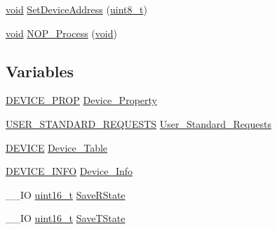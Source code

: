\begin{DoxyCompactItemize}
\item 
\hyperlink{group___n_a_m_e_ga18028b8badbf1ea7e704ccac3c488e82}{void} \hyperlink{_s_t_m32_f30x_2_libraries_2_s_t_m32___u_s_b-_f_s-_device___driver_2inc_2usb__core_8h_afcdbe02cf447bb583c34dd9babbd9f5a}{Set\-Device\-Address} (\hyperlink{stdint_8h_aba7bc1797add20fe3efdf37ced1182c5}{uint8\-\_\-t})
\item 
\hyperlink{group___n_a_m_e_ga18028b8badbf1ea7e704ccac3c488e82}{void} \hyperlink{_s_t_m32_f30x_2_libraries_2_s_t_m32___u_s_b-_f_s-_device___driver_2inc_2usb__core_8h_a5576d2ea5bf87fec71925b8e20048e74}{N\-O\-P\-\_\-\-Process} (\hyperlink{group___n_a_m_e_ga18028b8badbf1ea7e704ccac3c488e82}{void})
\end{DoxyCompactItemize}
\subsection*{Variables}
\begin{DoxyCompactItemize}
\item 
\hyperlink{_s_t_m32_f10x_2_libraries_2_s_t_m32___u_s_b-_f_s-_device___driver_2inc_2usb__core_8h_a90353becd4185446508b796a7f39fbce}{D\-E\-V\-I\-C\-E\-\_\-\-P\-R\-O\-P} \hyperlink{group___p_i_o_s___u_s_b_h_o_o_k_ga646bdfc60e69ee637f2c39b5bb91dfec}{Device\-\_\-\-Property}
\item 
\hyperlink{_s_t_m32_f10x_2_libraries_2_s_t_m32___u_s_b-_f_s-_device___driver_2inc_2usb__core_8h_abf9887b82ae511cfb155d0d97c9a7c1a}{U\-S\-E\-R\-\_\-\-S\-T\-A\-N\-D\-A\-R\-D\-\_\-\-R\-E\-Q\-U\-E\-S\-T\-S} \hyperlink{group___p_i_o_s___u_s_b_h_o_o_k_ga8d70d0a7e05cf9c172e4304def6b65b8}{User\-\_\-\-Standard\-\_\-\-Requests}
\item 
\hyperlink{_s_t_m32_f10x_2_libraries_2_s_t_m32___u_s_b-_f_s-_device___driver_2inc_2usb__core_8h_a85594805bde95346bc3a19853317a89d}{D\-E\-V\-I\-C\-E} \hyperlink{group___p_i_o_s___u_s_b_h_o_o_k_gafa47e7c7d5d6fb4c682e16c89c1b7d75}{Device\-\_\-\-Table}
\item 
\hyperlink{_s_t_m32_f10x_2_libraries_2_s_t_m32___u_s_b-_f_s-_device___driver_2inc_2usb__core_8h_a6c959d0e0181f5f4b6a8b6b3f8e16760}{D\-E\-V\-I\-C\-E\-\_\-\-I\-N\-F\-O} \hyperlink{_s_t_m32_f30x_2_libraries_2_s_t_m32___u_s_b-_f_s-_device___driver_2inc_2usb__core_8h_aafdb1c0ee02432099324e826f25d0844}{Device\-\_\-\-Info}
\item 
\-\_\-\-\_\-\-I\-O \hyperlink{stdint_8h_a273cf69d639a59973b6019625df33e30}{uint16\-\_\-t} \hyperlink{_s_t_m32_f30x_2_libraries_2_s_t_m32___u_s_b-_f_s-_device___driver_2inc_2usb__core_8h_a647971c82714959babba9a403a2dc4e9}{Save\-R\-State}
\item 
\-\_\-\-\_\-\-I\-O \hyperlink{stdint_8h_a273cf69d639a59973b6019625df33e30}{uint16\-\_\-t} \hyperlink{_s_t_m32_f30x_2_libraries_2_s_t_m32___u_s_b-_f_s-_device___driver_2inc_2usb__core_8h_aa31db46e856400b3248915ee8cd589a0}{Save\-T\-State}
\end{DoxyCompactItemize}


